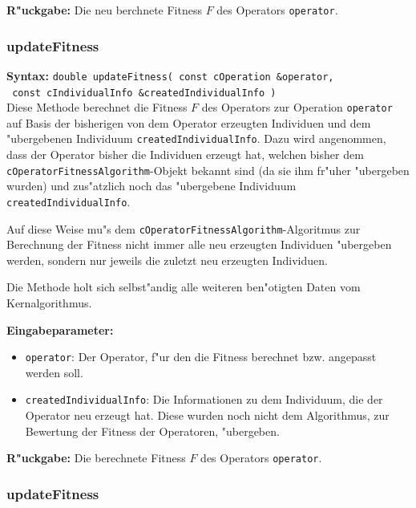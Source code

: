 \bigskip\noindent
\textbf{R"uckgabe:} Die neu berchnete Fitness $F$ des Operators \verb|operator|.


\subsubsection{updateFitness}

\textbf{Syntax:} \verb|double updateFitness( const cOperation &operator, | \\\verb| const cIndividualInfo &createdIndividualInfo )| \\

Diese Methode berechnet die Fitness $F$ des Operators zur Operation \verb|operator| auf Basis der bisherigen von dem Operator erzeugten Individuen und dem "ubergebenen Individuum \verb|createdIndividualInfo|. Dazu wird angenommen, dass der Operator bisher die Individuen erzeugt hat, welchen bisher dem \verb|cOperatorFitnessAlgorithm|-Objekt bekannt sind (da sie ihm fr"uher "ubergeben wurden) und zus"atzlich noch das "ubergebene Individuum \verb|createdIndividualInfo|.

Auf diese Weise mu"s dem \verb|cOperatorFitnessAlgorithm|-Algoritmus zur Berechnung der Fitness nicht immer alle neu erzeugten Individuen "ubergeben werden, sondern nur jeweils die zuletzt neu erzeugten Individuen.

Die Methode holt sich selbst"andig alle weiteren ben"otigten Daten vom Kernalgorithmus.

\bigskip\noindent
\textbf{Eingabeparameter:}
\begin{itemize}
 \item \verb|operator|: Der Operator, f"ur den die Fitness berechnet bzw. angepasst werden soll.
 \item \verb|createdIndividualInfo|: Die Informationen zu dem Individuum, die der Operator neu erzeugt hat. Diese wurden noch nicht dem Algorithmus, zur Bewertung der Fitness der Operatoren, "ubergeben.
\end{itemize}

\bigskip\noindent
\textbf{R"uckgabe:} Die berechnete Fitness $F$ des Operators \verb|operator|.


\subsubsection{updateFitness}

